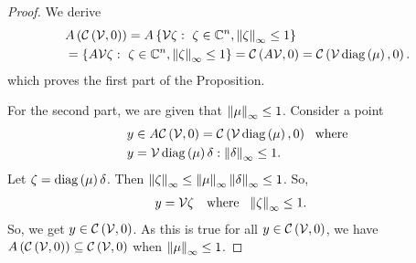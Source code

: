 % 
\begin{proof}
We derive
\begin{align*}
& A\lt(\cztope{\ptemp}{0}\rt) =
A\set{\ptemp\zeta:~\zeta\in\compnums^n,\infnorm{\zeta}\leq 1}\\
& =\set{A\ptemp\zeta:~\zeta\in\compnums^n,\infnorm{\zeta}\leq 1}
= \cztope{A\ptemp}{0}=\cztope{\ptemp\diagonal{\mu}}{0}.
\end{align*}
%
which proves the first part of the
Proposition.

For the second part, we are given that $\infnorm{\mu}\leq 1$.
Consider a point
%
\begin{align*}
  & y\in A\cztope{\ptemp}{0}=\cztope{\ptemp\diagonal{\mu}}{0}~~\text{where}\\
  &y = \ptemp\diagonal{\mu}\delta:\infnorm{\delta}\leq
1.
\end{align*}
%
Let $\zeta = \diagonal{\mu}\delta$. Then $\infnorm{\zeta} \leq
\infnorm{\mu}\infnorm{\delta} \leq 1$.  So,
%
\begin{align*}
  & y=\ptemp\zeta~~\text{ where }~
  \infnorm{\zeta}\leq 1.
\end{align*}
%
So, we get $y\in \cztope{\ptemp}{0}$.  As this is true for all
$y\in\cztope{\ptemp}{0}$, we have
$A\lt(\cztope{\ptemp}{0}\rt)\subseteq
\cztope{\ptemp}{0}$ when $\infnorm{\mu}\leq 1$.
\end{proof}
%



